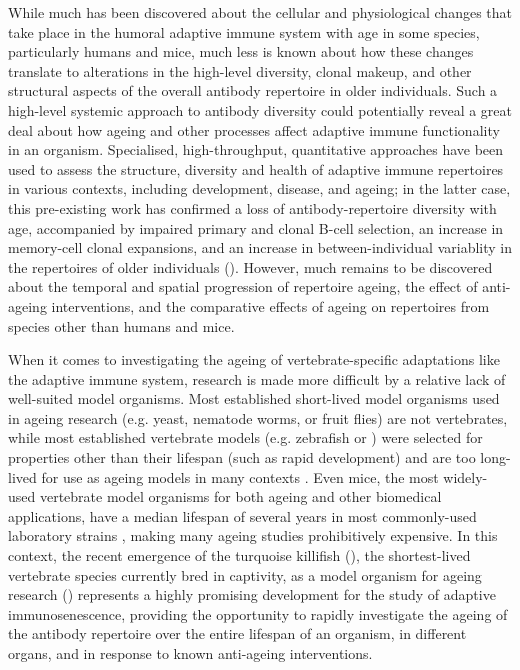 While much has been discovered about the cellular and physiological changes that take place in the humoral adaptive immune system with age in some species, particularly humans and mice, much less is known about how these changes translate to alterations in the high-level diversity, clonal makeup, and other structural aspects of the overall antibody repertoire in older individuals. Such a high-level systemic approach to antibody diversity could potentially reveal a great deal about how ageing and other processes affect adaptive immune functionality in an organism. Specialised, high-throughput, quantitative approaches \parencite{georgiou2014promise} have been used to assess the structure, diversity and health of adaptive immune repertoires in various contexts, including development, disease, and ageing; in the latter case, this pre-existing work has confirmed a loss of antibody-repertoire diversity with age, accompanied by impaired primary and clonal B-cell selection, an increase in memory-cell clonal expansions, and an increase in between-individual variablity in the repertoires of older individuals (). However, much remains to be discovered about the temporal and spatial progression of repertoire ageing, the effect of anti-ageing interventions, and the comparative effects of ageing on repertoires from species other than humans and mice.

When it comes to investigating the ageing of vertebrate-specific adaptations like the adaptive immune system, research is made more difficult by a relative lack of well-suited model organisms. Most established short-lived model organisms used in ageing research (e.g. yeast, nematode worms, or fruit flies) are not vertebrates, while most established vertebrate models (e.g. zebrafish or ) were selected for properties other than their lifespan (such as rapid development) and are too long-lived for use as ageing models in many contexts \parencite{gerhard2002zebrafish,bowler1977longevity}. Even mice, the most widely-used vertebrate model organisms for both ageing and other biomedical applications, have a median lifespan of several years in most commonly-used laboratory strains \parencite{yuan2009aging}, making many ageing studies prohibitively expensive. In this context, the recent emergence of the turquoise killifish (\nfu), the shortest-lived vertebrate species currently bred in captivity, as a model organism for ageing research () represents a highly promising development for the study of adaptive immunosenescence, providing the opportunity to rapidly investigate the ageing of the antibody repertoire over the entire lifespan of an organism, in different organs, and in response to known anti-ageing interventions. 

